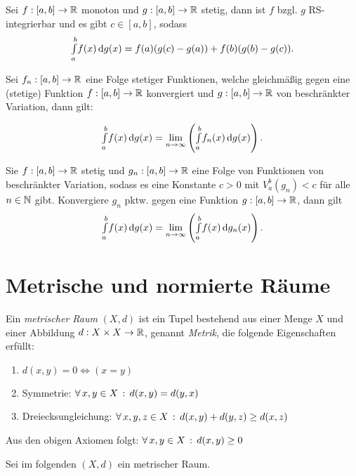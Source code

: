 \documentclass{cheat-sheet}
\begin{document}
\begin{satz}
Sei $f : [a, b] \to \mathbb{R}$ monoton und $g : [a, b] \to \mathbb{R}$ stetig, dann ist $f$ bzgl. $g$ RS-integrierbar und es gibt $c \in [a, b]$, sodass
\[ {\textstyle \int\limits_{a}^{b}} f(x) \,\mathrm{d} g(x) = f(a)(g(c) - g(a)) + f(b)(g(b) - g(c)). \]
\end{satz}

\begin{satz}
Sei $f_n : [a, b] \to \mathbb{R}$ eine Folge stetiger Funktionen, welche gleichmäßig gegen eine (stetige) Funktion $f : [a, b] \to \mathbb{R}$ konvergiert und $g : [a, b] \to \mathbb{R}$ von beschränkter Variation, dann gilt:

\[ {\textstyle \int\limits_{a}^{b}} f(x) \,\mathrm{d} g(x) = \lim_{n \to \infty} \left({\textstyle \int\limits_{a}^{b}} f_n(x) \,\mathrm{d} g(x)\right). \]
\end{satz}

\begin{satz}
Sie $f : [a, b] \to \mathbb{R}$ stetig und $g_n : [a, b] \to \mathbb{R}$ eine Folge von Funktionen von beschränkter Variation, sodass es eine Konstante $c > 0$ mit $V_a^b(g_n) < c$ für alle $n \in \mathbb{N}$ gibt. Konvergiere $g_n$ pktw. gegen eine Funktion $g : [a, b] \to \mathbb{R}$, dann gilt
\[ {\textstyle \int\limits_{a}^{b}} f(x) \,\mathrm{d} g(x) = \lim_{n \to \infty} \left({\textstyle \int\limits_{a}^{b}} f(x) \,\mathrm{d} g_n(x)\right). \]
\end{satz}


\section{Metrische und normierte Räume}

\begin{defn}
Ein \emph{metrischer Raum} $(X, d)$ ist ein Tupel bestehend aus einer Menge $X$ und einer Abbildung $d : X \times X \to \mathbb{R}$, genannt \emph{Metrik}, die folgende Eigenschaften erfüllt:

\begin{enumerate}
  \item $d(x, y) = 0 \iff (x = y)$
  \item Symmetrie: $\forall \, {x, y \in X} \,:\, d(x, y) = d(y, x)$
  \item Dreiecksungleichung: $\forall \, {x, y, z \in X} \,:\, d(x, y) + d(y, z) \ge d(x, z)$
\end{enumerate}
\end{defn}

\begin{bem}
Aus den obigen Axiomen folgt: $\forall \, {x, y \in X} \,:\, d(x, y) \ge 0$
\end{bem}

\begin{nota}
Sei im folgenden $(X, d)$ ein metrischer Raum.
\end{nota}
\end{document}
